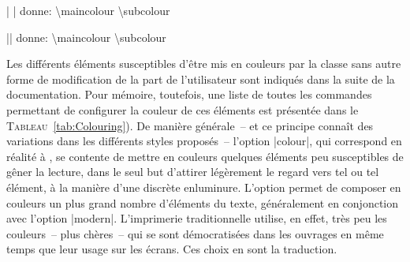\noindent\bgroup{}| | donne: \hfill {\maincolour\ttfamily\space\textbackslash maincolour} \hfill {\subcolour\ttfamily\textbackslash subcolour}\egroup

\noindent\bgroup{}|| donne: \hfill {\maincolour\ttfamily\textbackslash maincolour} \hfill {\subcolour\ttfamily\textbackslash subcolour}\egroup

Les différents éléments susceptibles d'être mis en couleurs par la classe sans autre forme de modification de la part de l'utilisateur sont indiqués dans la suite de la documentation. Pour mémoire, toutefois, une liste de toutes les commandes permettant de configurer la couleur de ces éléments est présentée dans le \textsc{Tableau}~\ref{tab:Colouring}). De manière générale~-- et ce principe connaît des variations dans les différents styles proposés~-- l'option |colour|, qui correspond en réalité à , se contente de mettre en couleurs quelques éléments peu susceptibles de gêner la lecture, dans le seul but d'attirer légèrement le regard vers tel ou tel élément, à la manière d'une discrète enluminure. L'option  permet de composer en couleurs un plus grand nombre d'éléments du texte, généralement en conjonction avec l'option |modern|. L'imprimerie traditionnelle utilise, en effet, très peu les couleurs~-- plus chères~-- qui se sont démocratisées dans les ouvrages en même temps que leur usage sur les écrans. Ces choix en sont la traduction.


